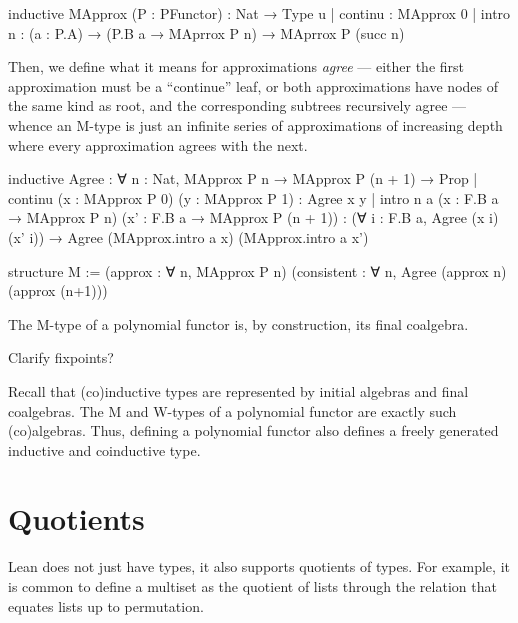 \begin{leancode}
  inductive MApprox (P : PFunctor) : Nat → Type u
  | continu : MApprox 0
  | intro {n} : (a : P.A) → (P.B a → MAprrox P n) → MAprrox P (succ n)
\end{leancode}

Then, we define what it means for approximations \emph{agree} --- either the first approximation must be a ``continue'' leaf, or both approximations have nodes of the same kind as root, and the corresponding subtrees recursively agree --- whence an M-type is just an infinite series of approximations of increasing depth where every approximation agrees with the next.

\begin{leancode}
  inductive Agree : ∀ {n : Nat}, MApprox P n → MApprox P (n + 1) → Prop
  | continu (x : MApprox P 0) (y : MApprox P 1) : Agree x y
  | intro {n} {a}   (x  : F.B a → MApprox P n) 
                    (x' : F.B a → MApprox P (n + 1)) 
                    : (∀ i : F.B a, Agree (x i) (x' i))
                    → Agree (MApprox.intro a x) (MApprox.intro a x')

  structure M := 
    (approx : ∀ n, MApprox P n) (consistent : ∀ n, Agree (approx n) (approx (n+1)))
\end{leancode}

The M-type of a polynomial functor is, by construction, its final coalgebra.

\begin{todo}

    Clarify fixpoints?

    Recall that (co)inductive types are represented by initial algebras and final coalgebras. The M and W-types of a polynomial functor are exactly such (co)algebras. Thus, defining a polynomial functor also defines a freely generated inductive and coinductive type.

\end{todo}

\section{Quotients}
Lean does not just have \inductive{} types, it also supports quotients of types. For example, it is common to define a multiset as the quotient of lists through the relation that equates lists up to permutation.

